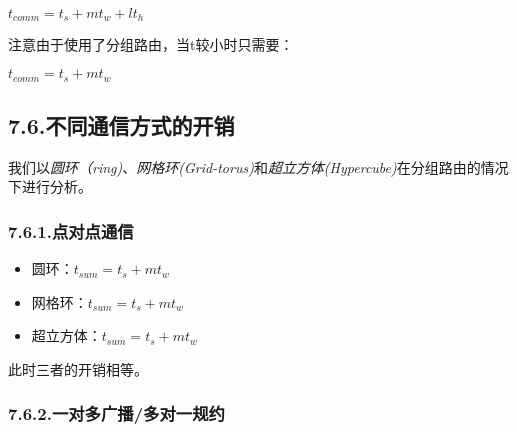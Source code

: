 \documentclass{article}
\begin{document}
\noindent{}$t_{comm} = t_s + mt_w+ lt_h$%

注意由于使用了分组路由，当t较小时只需要：%

$t_{comm} = t_s + mt_w$%

\subsection{7.6.\hspace*{0.5em}不同通信方式的开销}\label{section}%

\noindent{}我们以\emph{圆环（ring)}、\emph{网格环(Grid-torus)}和\emph{超立方体(Hypercube)}在分组路由的情况下进行分析。%

\subsubsection{7.6.1.\hspace*{0.5em}点对点通信}\label{section}%

\begin{itemize}[noitemsep,topsep=\mdcompacttopsep]%

\item{}圆环：$t_{sum} = t_s + mt_w$%

\item{}网格环：$t_{sum} = t_s + mt_w$%

\item{}超立方体：$t_{sum} = t_s + mt_w$%
\end{itemize}%

\noindent{}此时三者的开销相等。%

\subsubsection{7.6.2.\hspace*{0.5em}一对多广播/多对一规约}\label{section}%
\end{document}
